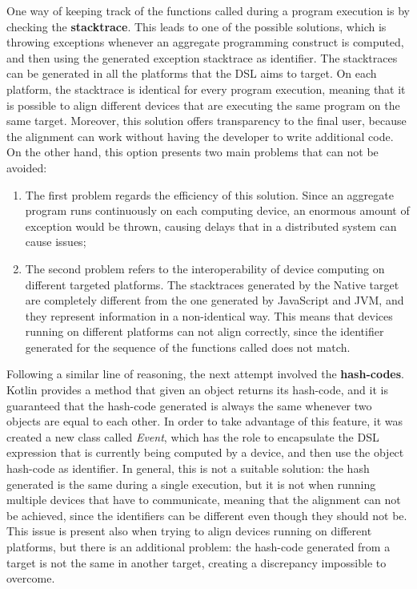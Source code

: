 One way of keeping track of the functions called during a program execution is by checking the \textbf{stacktrace}. This leads to one of the possible solutions, which is throwing exceptions whenever an aggregate programming construct is computed, and then using the generated exception stacktrace as identifier.\newline
The stacktraces can be generated in all the platforms that the DSL aims to target. On each platform, the stacktrace is identical for every program execution, meaning that it is possible to align different devices that are executing the same program on the same target.\newline
Moreover, this solution offers transparency to the final user, because the alignment can work without having the developer to write additional code.\newline
On the other hand, this option presents two main problems that can not be avoided:
\begin{enumerate}
    \item The first problem regards the efficiency of this solution. Since an aggregate program runs continuously on each computing device, an enormous amount of exception would be thrown, causing delays that in a distributed system can cause issues;
    \item The second problem refers to the interoperability of device computing on different targeted platforms. The stacktraces generated by the Native target are completely different from the one generated by JavaScript and JVM, and they represent information in a non-identical way. This means that devices running on different platforms can not align correctly, since the identifier generated for the sequence of the functions called does not match.
\end{enumerate}

Following a similar line of reasoning, the next attempt involved the \textbf{hash-codes}. Kotlin provides a method that given an object returns its hash-code, and it is guaranteed that the hash-code generated is always the same whenever two objects are equal to each other. In order to take advantage of this feature, it was created a new class called \textit{Event}, which has the role to encapsulate the DSL expression that is currently being computed by a device, and then use the object hash-code as identifier.\newline
In general, this is not a suitable solution: the hash generated is the same during a single execution, but it is not when running multiple devices that have to communicate, meaning that the alignment can not be achieved, since the identifiers can be different even though they should not be.\newline
This issue is present also when trying to align devices running on different platforms, but there is an additional problem: the hash-code generated from a target is not the same in another target, creating a discrepancy impossible to overcome.

